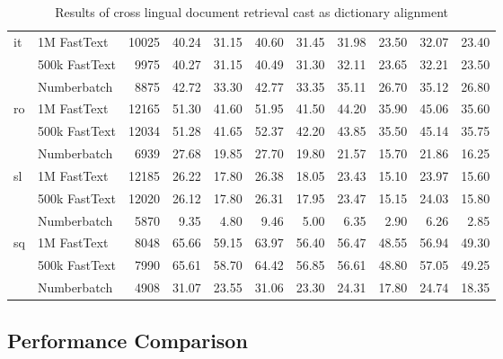 \begin{landscape}
\begin{table}[htbp]
\begin{tabular}{llr|rr|rr|rr|rr}
            \multirow{3}{*}{it} & 1M FastText & 10025 & 40.24 & 31.15 & 40.60 & 31.45 & 31.98 & 23.50 & 32.07 & 23.40 \\
                                & 500k FastText & 9975 & 40.27 & 31.15 & 40.49 & 31.30 & 32.11 & 23.65 & 32.21 & 23.50 \\
                                & Numberbatch & 8875 & 42.72 & 33.30 & 42.77 & 33.35 & 35.11 & 26.70 & 35.12 & 26.80 \\ \cmidrule(lr){2-11}
            \multirow{3}{*}{ro} & 1M FastText & 12165 & 51.30 & 41.60 & 51.95 & 41.50 & 44.20 & 35.90 & 45.06 & 35.60 \\
                                & 500k FastText & 12034 & 51.28 & 41.65 & 52.37 & 42.20 & 43.85 & 35.50 & 45.14 & 35.75 \\
                                & Numberbatch & 6939 & 27.68 & 19.85 & 27.70 & 19.80 & 21.57 & 15.70 & 21.86 & 16.25 \\ \cmidrule(lr){2-11}
            \multirow{3}{*}{sl} & 1M FastText & 12185 & 26.22 & 17.80 & 26.38 & 18.05 & 23.43 & 15.10 & 23.97 & 15.60 \\
                                & 500k FastText & 12020 & 26.12 & 17.80 & 26.31 & 17.95 & 23.47 & 15.15 & 24.03 & 15.80 \\
                                & Numberbatch & 5870 & 9.35 & 4.80 & 9.46 & 5.00 & 6.35 & 2.90 & 6.26 & 2.85 \\ \cmidrule(lr){2-11}
            \multirow{3}{*}{sq} & 1M FastText & 8048 & 65.66 & 59.15 & 63.97 & 56.40 & 56.47 & 48.55 & 56.94 & 49.30 \\
                                & 500k FastText & 7990 & 65.61 & 58.70 & 64.42 & 56.85 & 56.61 & 48.80 & 57.05 & 49.25 \\
                                & Numberbatch & 4908 & 31.07 & 23.55 & 31.06 & 23.30 & 24.31 & 17.80 & 24.74 & 18.35 \\
                                \bottomrule
        \end{tabular}
        \caption{Results of cross lingual document retrieval cast as dictionary alignment}%
        \label{tab:cldr_results}
    \end{table}
\end{landscape}

\subsection{Performance Comparison}%
\label{sub:performance_comparison}

